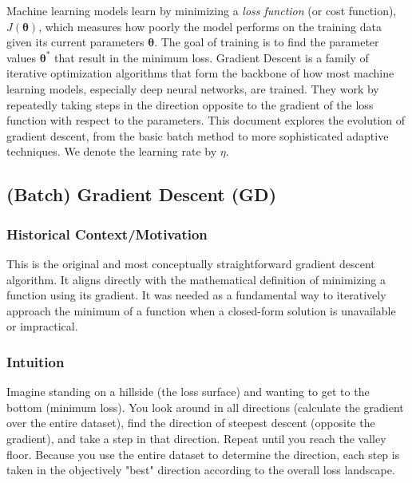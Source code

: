 \documentclass{article}
\newcommand{\btheta}{\bm{\theta}}
\begin{document}
Machine learning models learn by minimizing a \emph{loss function} (or cost function), $J(\btheta)$, which measures how poorly the model performs on the training data given its current parameters $\btheta$. The goal of training is to find the parameter values $\btheta^*$ that result in the minimum loss. Gradient Descent is a family of iterative optimization algorithms that form the backbone of how most machine learning models, especially deep neural networks, are trained. They work by repeatedly taking steps in the direction opposite to the gradient of the loss function with respect to the parameters. This document explores the evolution of gradient descent, from the basic batch method to more sophisticated adaptive techniques. We denote the learning rate by $\eta$.

\subsection{(Batch) Gradient Descent (GD)}

\subsubsection{Historical Context/Motivation}
This is the original and most conceptually straightforward gradient descent algorithm. It aligns directly with the mathematical definition of minimizing a function using its gradient. It was needed as a fundamental way to iteratively approach the minimum of a function when a closed-form solution is unavailable or impractical.

\subsubsection{Intuition}
Imagine standing on a hillside (the loss surface) and wanting to get to the bottom (minimum loss). You look around in all directions (calculate the gradient over the entire dataset), find the direction of steepest descent (opposite the gradient), and take a step in that direction. Repeat until you reach the valley floor. Because you use the entire dataset to determine the direction, each step is taken in the objectively "best" direction according to the overall loss landscape.
\end{document}
